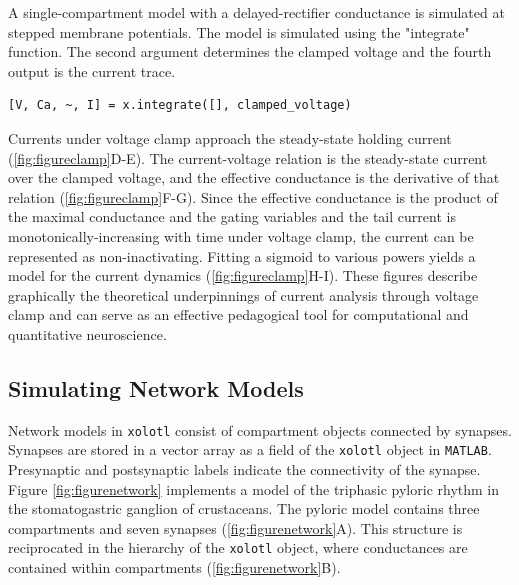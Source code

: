\documentclass{frontiersSCNS} %
\begin{document}
A single-compartment model with a delayed-rectifier conductance is simulated at stepped membrane potentials. The model is simulated using the "integrate" function. The second argument determines the clamped voltage and the fourth output is the current trace.

\begin{lstlisting}[style=Matlab-editor]
	[V, Ca, ~, I] = x.integrate([], clamped_voltage)
\end{lstlisting}

Currents under voltage clamp approach the steady-state holding current (\ref{fig:figureclamp}D-E). The current-voltage relation is the steady-state current over the clamped voltage, and the effective conductance is the derivative of that relation (\ref{fig:figureclamp}F-G). Since the effective conductance is the product of the maximal conductance and the gating variables \autocite{dayanTheoreticalNeuroscience2001, turrigianoSelectiveRegulationCurrent1995} and the tail current is monotonically-increasing with time under voltage clamp, the current can be represented as non-inactivating. Fitting a sigmoid to various powers yields a model for the current dynamics (\ref{fig:figureclamp}H-I). These figures describe graphically the theoretical underpinnings of current analysis through voltage clamp and can serve as an effective pedagogical tool for computational and quantitative neuroscience.

%
%
%
%
%
%

\subsection{Simulating Network Models}

Network models in \texttt{xolotl} consist of compartment objects connected by synapses. Synapses are stored in a vector array as a field of the \texttt{xolotl} object in \texttt{MATLAB}. Presynaptic and postsynaptic labels indicate the connectivity of the synapse. Figure \ref{fig:figurenetwork} implements a model of the triphasic pyloric rhythm in the stomatogastric ganglion of crustaceans. The pyloric model contains three compartments and seven synapses (\ref{fig:figurenetwork}A). This structure is reciprocated in the hierarchy of the \texttt{xolotl} object, where conductances are contained within compartments (\ref{fig:figurenetwork}B).
\end{document}
